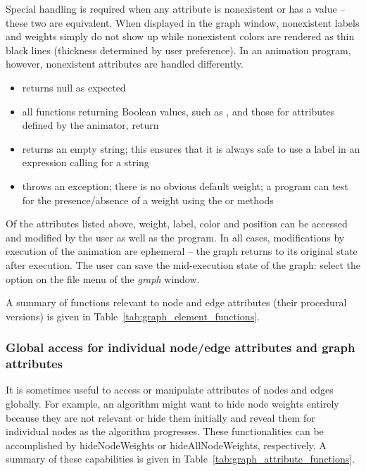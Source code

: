 Special handling is required when any attribute is nonexistent or has a
 value -- these two are equivalent.
When displayed in the graph window, nonexistent labels and weights simply do
not show up while nonexistent colors are rendered as thin black lines
(thickness determined by user preference).
In an animation program, however, nonexistent attributes are handled
differently.
\begin{itemize}
\item {} returns null as expected
\item all functions returning Boolean values, such as ,
   and those for attributes defined by the animator, return
\item {} returns an empty string; this ensures that it is always
  safe to use a label in an expression calling for a string
\item {} throws an exception; there is no obvious default
  weight; a program can test for the presence/absence of a weight using the
   or  methods
\end{itemize}

Of the attributes listed above, weight, label, color and position can be
accessed and modified by the user as well as the program.
In all cases, modifications by execution of the animation are ephemeral
-- the graph returns to its original state after execution.
The user can save the mid-execution state of the graph:
select the  option on the file menu of the
\emph{graph} window.



A summary of functions relevant to node and edge attributes (their procedural versions)
is given in Table~\ref{tab:graph_element_functions}.

\subsubsection{Global access for individual node/edge attributes and graph attributes}



It is sometimes useful to access or manipulate attributes of nodes and edges
globally.
For example, an algorithm might want to hide node weights entirely
because they are not relevant
or hide them initially and reveal them for individual nodes as
the algorithm progresses.
These functionalities can be accomplished by
\textsf{hideNodeWeights} or \textsf{hideAllNodeWeights}, respectively.
A summary of these capabilities is given in Table~\ref{tab:graph_attribute_functions}.

